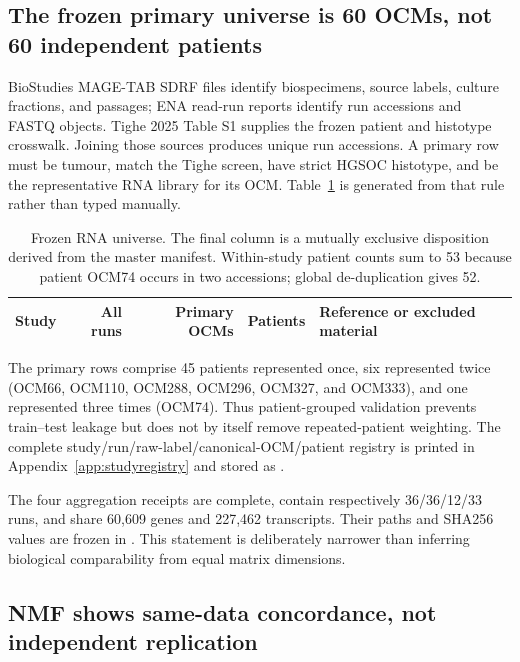 \documentclass[10pt]{article}
\begin{document}
\subsection{The frozen primary universe is 60 OCMs, not 60 independent patients}

BioStudies MAGE-TAB SDRF files identify biospecimens, source labels, culture
fractions, and passages; ENA read-run reports identify run accessions and FASTQ
objects.  Tighe 2025 Table S1 supplies the frozen patient and histotype
crosswalk\cite{tighe2025}.  Joining those sources produces \ManifestRunCount{}
unique run accessions.  A primary row must be tumour, match the Tighe screen,
have strict HGSOC histotype, and be the representative RNA library for its OCM.
Table~\ref{tab:cohorts} is generated from that rule rather than typed manually.

\begin{table}[t]
\centering
\caption{Frozen RNA universe.  The final column is a mutually exclusive
disposition derived from the master manifest.  Within-study patient counts sum
to 53 because patient OCM74 occurs in two accessions; global de-duplication
gives 52.}
\label{tab:cohorts}
\begin{tabular}{lrrrp{6.0cm}}
\toprule
Study & All runs & Primary OCMs & Patients & Reference or excluded material \\
\midrule

\bottomrule
\end{tabular}
\end{table}

The \PrimaryOCMCount{} primary rows comprise 45 patients represented once, six
represented twice (OCM66, OCM110, OCM288, OCM296, OCM327, and OCM333), and one
represented three times (OCM74).  Thus patient-grouped validation prevents
train--test leakage but does not by itself remove repeated-patient weighting.
The complete study/run/raw-label/canonical-OCM/patient registry is printed in
Appendix~\ref{app:studyregistry} and stored as
.

The four aggregation receipts are complete, contain respectively
36/36/12/33 runs, and share 60,609 genes and 227,462 transcripts.  Their paths
and SHA256 values are frozen in
.  This statement is deliberately
narrower than inferring biological comparability from equal matrix dimensions.

\subsection{NMF shows same-data concordance, not independent replication}
\end{document}
